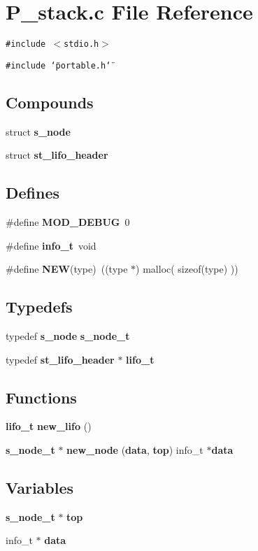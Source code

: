 \section{P\_\-stack.c File Reference}
\label{P__stack_8c}
{\tt \#include $<$stdio.h$>$}\par
{\tt \#include \char`\"{}portable.h\char`\"{}}\par
\subsection*{Compounds}
\begin{CompactItemize}
\item 
struct {\bf s\_\-node}
\item 
struct {\bf st\_\-lifo\_\-header}
\end{CompactItemize}
\subsection*{Defines}
\begin{CompactItemize}
\item 
\#define {\bf MOD\_\-DEBUG}\ 0
\item 
\#define {\bf info\_\-t}\ void
\item 
\#define {\bf NEW}(type)\ ((type $\ast$) malloc( sizeof(type) ))
\end{CompactItemize}
\subsection*{Typedefs}
\begin{CompactItemize}
\item 
typedef {\bf s\_\-node} {\bf s\_\-node\_\-t}
\item 
typedef {\bf st\_\-lifo\_\-header} $\ast$ {\bf lifo\_\-t}
\end{CompactItemize}
\subsection*{Functions}
\begin{CompactItemize}
\item 
{\bf lifo\_\-t} {\bf new\_\-lifo} ()
\item 
{\bf s\_\-node\_\-t} $\ast$ {\bf new\_\-node} ({\bf data}, {\bf top}) info\_\-t $\ast${\bf data}
\end{CompactItemize}
\subsection*{Variables}
\begin{CompactItemize}
\item 
{\bf s\_\-node\_\-t} $\ast$ {\bf top}
\item 
info\_\-t $\ast$ {\bf data}
\end{CompactItemize}


